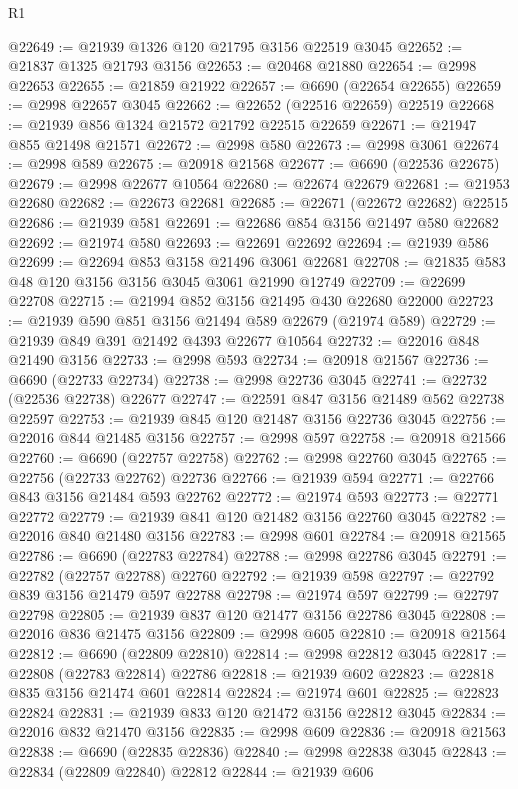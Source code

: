 \begin{lexlean}{R1}
\begin{coremodule}
@22649 := @21939 @1326 @120 @21795 @3156 @22519 @3045
@22652 := @21837 @1325 @21793 @3156
@22653 := @20468 @21880
@22654 := @2998 @22653
@22655 := @21859 @21922
@22657 := @6690 (@22654 @22655)
@22659 := @2998 @22657 @3045
@22662 := @22652 (@22516 @22659) @22519
@22668 := @21939 @856 @1324 @21572 @21792 @22515 @22659
@22671 := @21947 @855 @21498 @21571
@22672 := @2998 @580
@22673 := @2998 @3061
@22674 := @2998 @589
@22675 := @20918 @21568
@22677 := @6690 (@22536 @22675)
@22679 := @2998 @22677 @10564
@22680 := @22674 @22679
@22681 := @21953 @22680
@22682 := @22673 @22681
@22685 := @22671 (@22672 @22682) @22515
@22686 := @21939 @581
@22691 := @22686 @854 @3156 @21497 @580 @22682
@22692 := @21974 @580
@22693 := @22691 @22692
@22694 := @21939 @586
@22699 := @22694 @853 @3158 @21496 @3061 @22681
@22708 := @21835 @583 @48 @120 @3156 @3156 @3045 @3061 @21990 @12749
@22709 := @22699 @22708
@22715 := @21994 @852 @3156 @21495 @430 @22680 @22000
@22723 := @21939 @590 @851 @3156 @21494 @589 @22679 (@21974 @589)
@22729 := @21939 @849 @391 @21492 @4393 @22677 @10564
@22732 := @22016 @848 @21490 @3156
@22733 := @2998 @593
@22734 := @20918 @21567
@22736 := @6690 (@22733 @22734)
@22738 := @2998 @22736 @3045
@22741 := @22732 (@22536 @22738) @22677
@22747 := @22591 @847 @3156 @21489 @562 @22738 @22597
@22753 := @21939 @845 @120 @21487 @3156 @22736 @3045
@22756 := @22016 @844 @21485 @3156
@22757 := @2998 @597
@22758 := @20918 @21566
@22760 := @6690 (@22757 @22758)
@22762 := @2998 @22760 @3045
@22765 := @22756 (@22733 @22762) @22736
@22766 := @21939 @594
@22771 := @22766 @843 @3156 @21484 @593 @22762
@22772 := @21974 @593
@22773 := @22771 @22772
@22779 := @21939 @841 @120 @21482 @3156 @22760 @3045
@22782 := @22016 @840 @21480 @3156
@22783 := @2998 @601
@22784 := @20918 @21565
@22786 := @6690 (@22783 @22784)
@22788 := @2998 @22786 @3045
@22791 := @22782 (@22757 @22788) @22760
@22792 := @21939 @598
@22797 := @22792 @839 @3156 @21479 @597 @22788
@22798 := @21974 @597
@22799 := @22797 @22798
@22805 := @21939 @837 @120 @21477 @3156 @22786 @3045
@22808 := @22016 @836 @21475 @3156
@22809 := @2998 @605
@22810 := @20918 @21564
@22812 := @6690 (@22809 @22810)
@22814 := @2998 @22812 @3045
@22817 := @22808 (@22783 @22814) @22786
@22818 := @21939 @602
@22823 := @22818 @835 @3156 @21474 @601 @22814
@22824 := @21974 @601
@22825 := @22823 @22824
@22831 := @21939 @833 @120 @21472 @3156 @22812 @3045
@22834 := @22016 @832 @21470 @3156
@22835 := @2998 @609
@22836 := @20918 @21563
@22838 := @6690 (@22835 @22836)
@22840 := @2998 @22838 @3045
@22843 := @22834 (@22809 @22840) @22812
@22844 := @21939 @606

\end{coremodule}
\end{lexlean}
